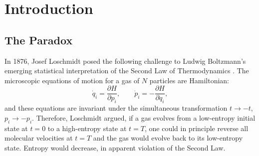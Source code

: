 \documentclass[twocolumn,10pt,a4paper]{article}
\theoremstyle{definition}
\theoremstyle{remark}
\begin{document}
\begin{abstract}
\vspace{0.2cm}
\noindent We provide a comprehensive numerical validation of the principal theorems through seven experiments comprising $162$ sub-tests across approximately five orders of magnitude of physical parameters. All $162$ sub-tests pass. Identities involving fundamental constants ($t = M/f$, $E = \hbar\omega_0$) hold to floating-point precision; operational claims (irreversibility of the partition count, asymmetry of becoming, oscillation as forward re-placement) are verified across hundreds of randomised trials. The principle that ``oscillation is forward re-placement, not return'' is verified directly on a $10{,}000$-cycle simulation in which the partition count reaches $99{,}990$ monotonically---five orders of magnitude beyond what the naive-return hypothesis would predict.

\vspace{0.3cm}
\noindent\textbf{Keywords:} Loschmidt's paradox, time-reversibility, mass spectrometry, partition counting, constitutive asymmetry, arrow of time, Second Law of Thermodynamics, irreversibility
\end{abstract}

\section{Introduction}
\label{sec:introduction}

\subsection{The Paradox}

In 1876, Josef Loschmidt posed the following challenge to Ludwig Boltzmann's emerging statistical interpretation of the Second Law of Thermodynamics \citep{loschmidt1876,loschmidt1877}. The microscopic equations of motion for a gas of $N$ particles are Hamiltonian:
\begin{equation}
    \dot{q}_i = \frac{\partial H}{\partial p_i}, \qquad \dot{p}_i = -\frac{\partial H}{\partial q_i},
    \label{eq:hamilton}
\end{equation}
and these equations are invariant under the simultaneous transformation $t \to -t$, $p_i \to -p_i$. Therefore, Loschmidt argued, if a gas evolves from a low-entropy initial state at $t = 0$ to a high-entropy state at $t = T$, one could in principle reverse all molecular velocities at $t = T$ and the gas would evolve back to its low-entropy state. Entropy would decrease, in apparent violation of the Second Law.
\end{document}
